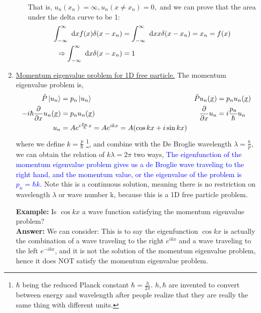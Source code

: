 \documentclass{school-22.101-notes}
\begin{document}
\begin{enumerate}
\begin{enumerate}
    That is, $u_n(x_n) = \infty, u_n (x\neq x_n) = 0,$ and we can prove that the area under the delta curve to be 1: 
    \begin{align}
      \int_{-\infty}^{\infty} \mbox{ }\mathrm{d} x f(x) \delta(x-x_n) &=  \int_{-\infty}^{\infty} \mbox{ }\mathrm{d} x x \delta(x-x_n) = x_n = f(x) \\
      \Rightarrow \int_{-\infty}^{\infty} \mbox{ }\mathrm{d} x \delta(x-x_n) &= 1 
    \end{align}
  \end{enumerate}

\item \uline{Momentum eigenvalue problem for 1D free particle.} The momentum eigenvalue problem is, 
\begin{align}
  \hat{P} \left| u_n \right> &= p_n \left| u_n \right>  &   \hat{P} u_n(\underline{x}) &= p_n u_n(\underline{x}) \\
  -i\hbar \frac{\partial}{\partial x} u_n(\underline{x}) &= p_n u_n(\underline{x}) &  \frac{\partial}{\partial x} u_n &= i \frac{p_n}{\hbar} u_n   \\
  u_n &= A e^{i \frac{p_n}{\hbar} x} = A e^{ikx} = A (\cos kx + i \sin kx) 
\end{align}
where we define $\boxed{k = \frac{p}{\hbar}}$ \footnote{$\hbar$ being the reduced Planck constant $\hbar = \frac{h}{2\pi}$. $h, \hbar$ are invented to convert between energy and wavelength after people realize that they are really the same thing with different units.}, and combine with the De Broglie wavelength $\lambda = \frac{h}{p}$, we can obtain the relation of $ \boxed{k \lambda = 2 \pi}$ two ways, 
\textcolor{blue}{The eigenfunction of the momentum eigenvalue problem gives us a de Broglie wave traveling to the right hand, and the momentum value, or the eigenvalue of the problem is $p_n = \hbar k$.} Note this is a continuous solution, meaning there is no restriction on wavelength $\lambda$ or wave number k, because this is a 1D free particle problem. 

\textbf{Example:} Is $\cos kx$ a wave function satisfying the momentum eigenvalue problem? \\
\textbf{Answer:} We can consider:
This is to say the eigenfunction $\cos kx$ is actually the combination of a wave traveling to the right $e^{ikx}$ and a wave traveling to the left $e^{-ikx}$, and it is not the solution of the momentum eigenvalue problem, hence it does NOT satisfy the momentum eigenvalue problem. 



\end{enumerate}
\end{document}
